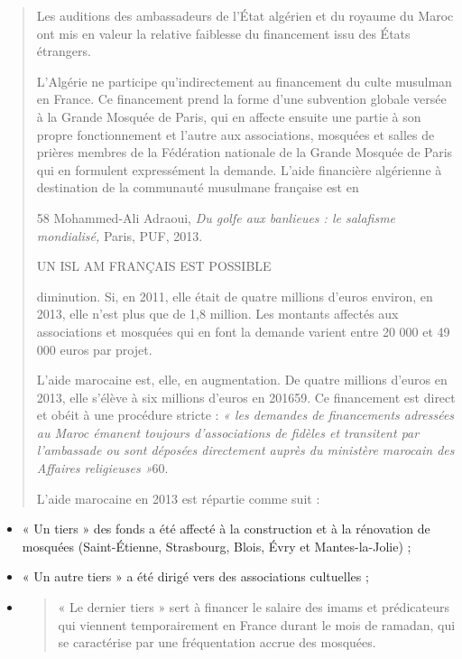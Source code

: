 \begin{quote}
Les auditions des ambassadeurs de l'État algérien et du royaume du Maroc
ont mis en valeur la relative faiblesse du financement issu des États
étrangers.

L'Algérie ne participe qu'indirectement au financement du culte musulman
en France. Ce financement prend la forme d'une subvention globale versée
à la Grande Mosquée de Paris, qui en affecte ensuite une partie à son
propre fonctionnement et l'autre aux associations, mosquées et salles de
prières membres de la Fédération nationale de la Grande Mosquée de Paris
qui en formulent expressément la demande. L'aide financière algérienne à
destination de la communauté musulmane française est en

58 Mohammed-Ali Adraoui, \emph{Du golfe aux banlieues : le salafisme
mondialisé,} Paris, PUF, 2013.

UN ISL AM FRANÇAIS EST POSSIBLE

diminution. Si, en 2011, elle était de quatre millions d'euros environ,
en 2013, elle n'est plus que de 1,8 million. Les montants affectés aux
associations et mosquées qui en font la demande varient entre 20 000 et
49 000 euros par projet.

L'aide marocaine est, elle, en augmentation. De quatre millions d'euros
en 2013, elle s'élève à six millions d'euros en 201659. Ce financement
est direct et obéit à une procédure stricte : \emph{« les demandes de
financements adressées au Maroc émanent toujours d'associations de
fidèles et transitent par l'ambassade ou sont déposées directement
auprès du ministère marocain des Affaires religieuses »}60.

L'aide marocaine en 2013 est répartie comme suit :
\end{quote}

\begin{itemize}
\item
  « Un tiers » des fonds a été affecté à la construction et à la
  rénovation de mosquées (Saint-Étienne, Strasbourg, Blois, Évry et
  Mantes-la-Jolie) ;
\item
  « Un autre tiers » a été dirigé vers des associations cultuelles ;
\item
  \begin{quote}
  « Le dernier tiers » sert à financer le salaire des imams et
  prédicateurs qui viennent temporairement en France durant le mois de
  ramadan, qui se caractérise par une fréquentation accrue des mosquées.
  \end{quote}
\end{itemize}

